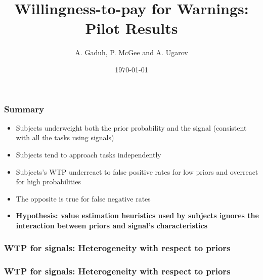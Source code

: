 \documentclass[11pt,hyperref={bookmarks=false}]{beamer}
\title[Willingness-to-pay for Warnings]{Willingness-to-pay for Warnings: Pilot Results}
\author[A. Gaduh, P. McGee and A. Ugarov]{A. Gaduh, P. McGee and A. Ugarov}
\institute[]{}
\date{\today}
\newcommand\BackgroundPic{%
\put(0,0){%
\parbox[b][\paperheight]{\paperwidth}{%
\vfill
\centering
\vfill
}}}
\begin{document}

\begin{frame}
\titlepage
\end{frame}


\begin{frame}
\frametitle{Summary}
\begin{itemize}
\item Subjects underweight both the prior probability and the signal (consistent with all the tasks using signals)
\item Subjects tend to approach tasks independently
\item Subjects's WTP underreact to false positive rates for low priors and overreact for high probabilities
\item The opposite is true for false negative rates
\item \textbf{Hypothesis: value estimation heuristics used by subjects ignores the interaction between priors and signal's characteristics}
\end{itemize}
\end{frame}

\begin{frame}
\frametitle{WTP for signals: Heterogeneity with respect to priors}
\footnotesize

\end{frame}


\begin{frame}
\frametitle{WTP for signals: Heterogeneity with respect to priors}
\footnotesize

\end{frame}
\end{document}

